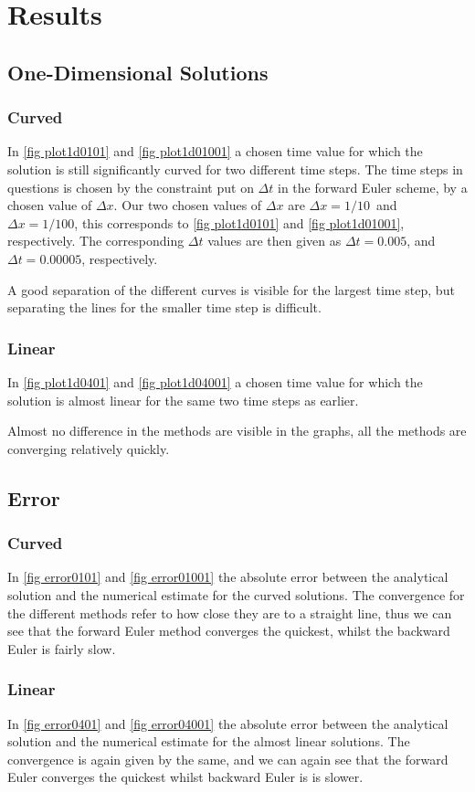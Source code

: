 \documentclass[%
reprint,
nofootinbib,
amsmath,amssymb,
aps,
]{revtex4-1}
\newcommand{\dt}{{\Delta t}}
\newcommand{\dx}{{\Delta x}}
\begin{document}
\section{Results} %
\subsection{One-Dimensional Solutions}
\subsubsection{Curved}
In \autoref{fig plot1d0101} and \autoref{fig plot1d01001} a chosen time value for which the solution is still significantly curved for two different time steps. The time steps in questions is chosen by the constraint put on $\dt$ in the forward Euler scheme, by a chosen value of $\dx$. Our two chosen values of $\dx$ are $\dx = 1/10$ and $\dx = 1/100$, this corresponds to \autoref{fig plot1d0101} and \autoref{fig plot1d01001}, respectively. The corresponding $\dt$ values are then given as $\dt = 0.005$, and $\dt = 0.00005$, respectively. 


A good separation of the different curves is visible for the largest time step, but separating the lines for the smaller time step is difficult. 
\subsubsection{Linear}
In \autoref{fig plot1d0401} and \autoref{fig plot1d04001} a chosen time value for which the solution is almost linear for the same two time steps as earlier. 

Almost no difference in the methods are visible in the graphs, all the methods are converging relatively quickly. 
\subsection{Error}
\subsubsection{Curved}
In \autoref{fig error0101} and \autoref{fig error01001} the absolute error between the analytical solution and the numerical estimate for the curved solutions. The convergence for the different methods refer to how close they are to a straight line, thus we can see that the forward Euler method converges the quickest, whilst the backward Euler is fairly slow. 
\subsubsection{Linear}
In \autoref{fig error0401} and \autoref{fig error04001} the absolute error between the analytical solution and the numerical estimate for the almost linear solutions. The convergence is again given by the same, and we can again see that the forward Euler converges the quickest whilst backward Euler is is slower. 
\end{document}
